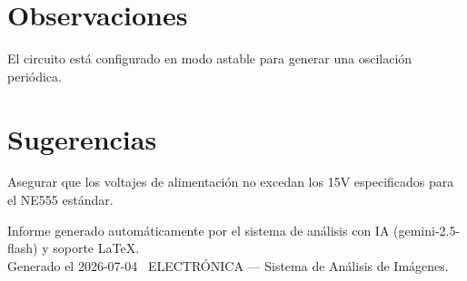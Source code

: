 \documentclass[11pt,a4paper]{article}
\begin{document}
\section*{Observaciones}
El circuito está configurado en modo astable para generar una oscilación periódica.

\section*{Sugerencias}
Asegurar que los voltajes de alimentación no excedan los 15V especificados para el NE555 estándar.

\vspace{12pt}
\begin{center}
  \footnotesize\color{gray}
  Informe generado automáticamente por el sistema de análisis con IA (gemini-2.5-flash) y soporte LaTeX. \\
  Generado el 2026-07-04 \textbullet\ ELECTRÓNICA --- Sistema de Análisis de Imágenes.
\end{center}
\end{document}
